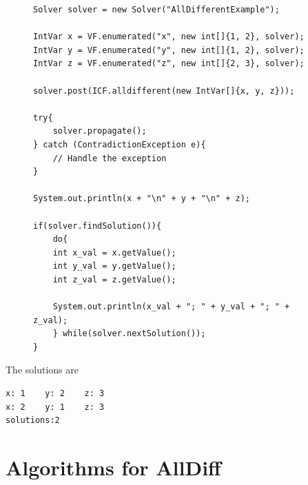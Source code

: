 \documentclass{l4proj}
\begin{document}
\begin{figure}
%
\begin{lstlisting}
Solver solver = new Solver("AllDifferentExample");

IntVar x = VF.enumerated("x", new int[]{1, 2}, solver); 
IntVar y = VF.enumerated("y", new int[]{1, 2}, solver);
IntVar z = VF.enumerated("z", new int[]{2, 3}, solver);

solver.post(ICF.alldifferent(new IntVar[]{x, y, z}));

try{
    solver.propagate();
} catch (ContradictionException e){
    // Handle the exception
}

System.out.println(x + "\n" + y + "\n" + z);

if(solver.findSolution()){
    do{
	int x_val = x.getValue();
	int y_val = y.getValue();
	int z_val = z.getValue();

	System.out.println(x_val + "; " + y_val + "; " + z_val);
    } while(solver.nextSolution());
}
\end{lstlisting}
\end{figure}

The solutions are
\begin{verbatim}
x: 1	y: 2	z: 3
x: 2	y: 1	z: 3
solutions:2
\end{verbatim}
 
\chapter{Algorithms for AllDiff}
\label{chap4alldiffalgos}
\end{document}
